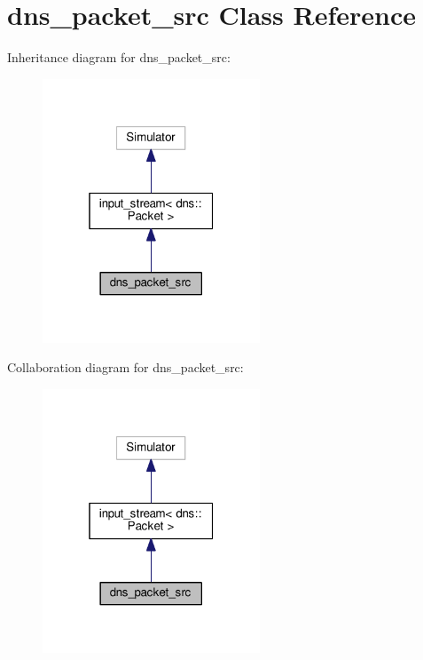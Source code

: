 \hypertarget{classdns__packet__src}{}\section{dns\+\_\+packet\+\_\+src Class Reference}
\label{classdns__packet__src}


Inheritance diagram for dns\+\_\+packet\+\_\+src\+:
\nopagebreak
\begin{figure}[H]
\begin{center}
\leavevmode
\includegraphics[width=184pt]{classdns__packet__src__inherit__graph}
\end{center}
\end{figure}


Collaboration diagram for dns\+\_\+packet\+\_\+src\+:
\nopagebreak
\begin{figure}[H]
\begin{center}
\leavevmode
\includegraphics[width=184pt]{classdns__packet__src__coll__graph}
\end{center}
\end{figure}
